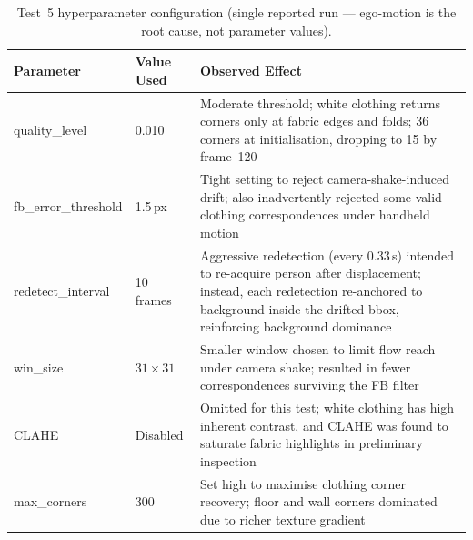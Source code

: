 \documentclass[12pt,a4paper]{article}
\begin{document}
\begin{table}[H]
\centering\small
\caption{Test~5 hyperparameter configuration (single reported run --- ego-motion is the root cause, not parameter values).}
\label{tab:hyper5}
\begin{tabularx}{\textwidth}{llX}
\toprule
\rowcolor{accentteal!20}
\textbf{Parameter} & \textbf{Value Used} & \textbf{Observed Effect} \\
\midrule
quality\_level & 0.010 & Moderate threshold; white clothing returns corners only at fabric edges and folds; 36 corners at initialisation, dropping to 15 by frame~120 \\
\midrule
fb\_error\_threshold & 1.5\,px & Tight setting to reject camera-shake-induced drift; also inadvertently rejected some valid clothing correspondences under handheld motion \\
\midrule
redetect\_interval & 10 frames & Aggressive redetection (every 0.33\,s) intended to re-acquire person after displacement; instead, each redetection re-anchored to background inside the drifted bbox, reinforcing background dominance \\
\midrule
win\_size & $31\times31$ & Smaller window chosen to limit flow reach under camera shake; resulted in fewer correspondences surviving the FB filter \\
\midrule
CLAHE & Disabled & Omitted for this test; white clothing has high inherent contrast, and CLAHE was found to saturate fabric highlights in preliminary inspection \\
\midrule
max\_corners & 300 & Set high to maximise clothing corner recovery; floor and wall corners dominated due to richer texture gradient \\
\bottomrule
\end{tabularx}
\end{table}
\end{document}
